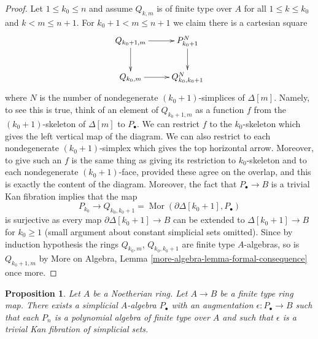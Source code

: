\documentclass{stacks-project}
\theoremstyle{plain}
\newtheorem{proposition}[subsection]{Proposition}
\theoremstyle{definition}
\theoremstyle{remark}
\numberwithin{equation}{subsection}
\def\Mor{\mathop{\mathrm{Mor}}\nolimits}
\begin{document}
\begin{proof}
\medskip\noindent
Let $1 \leq k_0 \leq n$ and assume $Q_{k, m}$ is of finite type
over $A$ for all $1 \leq k \leq k_0$ and $k < m \leq n + 1$.
For $k_0 + 1 < m \leq n + 1$ we claim there is a cartesian square
$$
\xymatrix{
Q_{k_0 + 1, m} \ar[d] \ar[r] & P_{k_0 + 1}^N \ar[d] \\
Q_{k_0, m} \ar[r] & Q_{k_0, k_0 + 1}^N
}
$$
where $N$ is the number of nondegenerate $(k_0 + 1)$-simplices
of $\Delta[m]$. Namely, to see this is true, think of an element of
$Q_{k_0 + 1, m}$ as a function $f$ from the $(k_0 + 1)$-skeleton
of $\Delta[m]$ to $P_\bullet$. We can restrict $f$ to the $k_0$-skeleton
which gives the left vertical map of the diagram. We can also restrict
to each nondegenerate $(k_0 + 1)$-simplex which gives the top horizontal
arrow. Moreover, to give such an $f$ is the same thing as giving its
restriction to $k_0$-skeleton and to each nondegenerate
$(k_0 + 1)$-face, provided these agree on the overlap, and this
is exactly the content of the diagram. Moreover, the fact that
$P_\bullet \to B$ is a trivial Kan fibration implies that
the map
$$
P_{k_0} \to Q_{k_0, k_0 + 1} = \Mor(\partial \Delta[k_0 + 1], P_\bullet)
$$
is surjective as every map $\partial \Delta[k_0 + 1] \to B$ can be extended
to $\Delta[k_0 + 1] \to B$ for $k_0 \geq 1$ (small argument about constant
simplicial sets omitted). Since by induction hypothesis the rings
$Q_{k_0, m}$, $Q_{k_0, k_0 + 1}$ are finite type $A$-algebras, so is
$Q_{k_0 + 1, m}$ by
More on Algebra, Lemma \ref{more-algebra-lemma-formal-consequence}
once more.
\end{proof}

\begin{proposition}
\label{proposition-polynomial}
Let $A$ be a Noetherian ring. Let $A \to B$ be a finite type ring map.
There exists a simplicial $A$-algebra $P_\bullet$ with an augmentation
$\epsilon : P_\bullet \to B$ such that each $P_n$ is a polynomial algebra
of finite type over $A$ and such that $\epsilon$ is a trivial
Kan fibration of simplicial sets.
\end{proposition}
\end{document}
